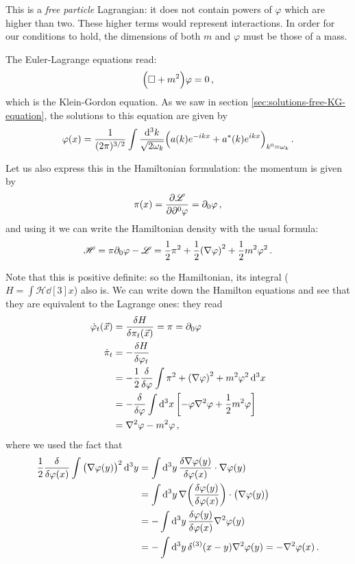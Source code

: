 \documentclass[main.tex]{subfiles}
\begin{document}
This is a \emph{free particle} Lagrangian: it does not contain powers of \(\varphi \) which are higher than two. These higher terms would represent interactions. 
In order for our conditions to hold, the dimensions of both \(m\) and \(\varphi \) must be those of a mass. 

The Euler-Lagrange equations read: 
%
\begin{align}
\qty(\square + m^2) \varphi = 0
\,,
\end{align}
%
which is the Klein-Gordon equation. 
As we saw in section \ref{sec:solutions-free-KG-equation}, the solutions to this equation are given by 
%
\begin{align}
\varphi (x) = 
\frac{1}{(2 \pi )^{3/2}} 
\int \frac{ \dd[3]{k}}{\sqrt{2 \omega_{k}}}
\qty(a(k) e^{-ikx} + a^{*}(k) e^{ikx})_{k^{0} = \omega_{k}}
\,.
\end{align}

Let us also express this in the Hamiltonian formulation: the momentum is given by 
%
\begin{align}
\pi (x) = \pdv{\mathscr{L}}{\partial^{0} \varphi } = \partial_{0} \varphi 
\,,
\end{align}
%
and using it we can write the Hamiltonian density with the usual formula: 
%
\begin{align}
\mathscr{H} = \pi \partial_{0} \varphi - \mathscr{L} = \frac{1}{2} \pi^2 + \frac{1}{2} \qty(\nabla \varphi )^2 + \frac{1}{2} m^2 \varphi^2
\,.
\end{align}

Note that this is positive definite: so the Hamiltonian, its integral (\(H = \int \mathscr{H} \dd[3]{x}\)) also is.
We can write down the Hamilton equations and see that they are equivalent to the Lagrange ones: they read 
%
\begin{align}
\dot{\varphi}_{t} (\vec{x}) &= \fdv{H}{\pi_{t} (\vec{x})}
 = \pi = \partial_{0} \varphi   \\
\dot{\pi}_{t} &= - \fdv{H}{\varphi_{t}}  \\
&= - \frac{1}{2} \fdv{}{\varphi } \int \pi^2 + \qty(\nabla \varphi)^2 + m^2 \varphi^2 \dd[3]{x}  \\
&= - \fdv{}{\varphi } \int \dd[3]{x} \qty[- \varphi \nabla^2 \varphi + \frac{1}{2} m^2 \varphi ]  \\
&= \nabla^2\varphi  - m^2 \varphi 
\,,
\end{align}
%
where we used the fact that 
%
\begin{align}
\frac{1}{2}\fdv{}{\varphi(x) } \int \qty(\nabla \varphi(y) )^2 \dd[3]{y} 
&= \int \dd[3]{y} \fdv{ \nabla \varphi (y) }{\varphi (x) } \cdot \nabla \varphi (y) \\
&= \int \dd[3]{y} \nabla \qty(\fdv{\varphi (y) }{\varphi( x) } ) \cdot\qty(\nabla \varphi (y) )  \\
&= - \int \dd[3]{y} \fdv{\varphi (y) }{\varphi(x) } \nabla^2 \varphi (y)   \\
&= - \int \dd[3]{y} \delta^{(3)} (x- y) \nabla^2 \varphi (y)
= - \nabla^2\varphi (x)
\,.
\end{align}
\end{document}
